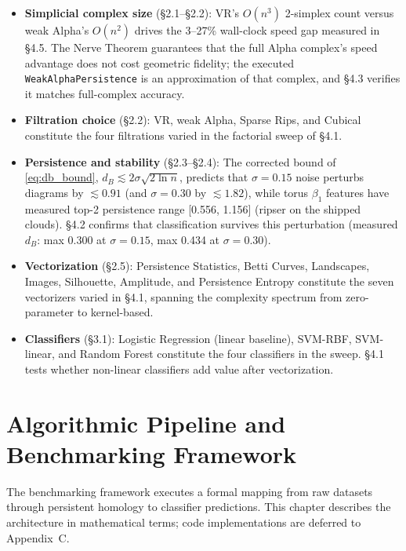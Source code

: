 \documentclass[12pt, a4paper]{report}
\newcommand{\Betti}{\beta}
\theoremstyle{definition}
\theoremstyle{plain}
\theoremstyle{remark}
\begin{document}
\begin{itemize}
  \item \textbf{Simplicial complex size} (\S2.1--\S2.2): VR's
    $O(n^3)$ 2-simplex count versus weak Alpha's $O(n^2)$ drives the
    3--27\% wall-clock speed gap measured in \S4.5. The Nerve
    Theorem guarantees that the full Alpha complex's speed advantage
    does not cost geometric fidelity; the executed
    \texttt{WeakAlphaPersistence} is an approximation of that
    complex, and \S4.3 verifies it matches full-complex accuracy.
  \item \textbf{Filtration choice} (\S2.2): VR, weak Alpha, Sparse Rips,
    and Cubical constitute the four filtrations varied in the
    factorial sweep of \S4.1.
  \item \textbf{Persistence and stability} (\S2.3--\S2.4): The
    corrected bound of \eqref{eq:db_bound}, $d_B \lesssim
    2\sigma\sqrt{2\ln n}$, predicts that $\sigma = 0.15$ noise
    perturbs diagrams by $\lesssim 0.91$ (and $\sigma=0.30$ by
    $\lesssim 1.82$), while torus $\Betti_1$ features have measured
    top-2 persistence range [0.556, 1.156] (ripser on the shipped
    clouds). \S4.2 confirms that classification survives this
    perturbation (measured $d_B$: max 0.300 at $\sigma=0.15$, max
    0.434 at $\sigma=0.30$).
  \item \textbf{Vectorization} (\S2.5): Persistence Statistics,
    Betti Curves, Landscapes, Images, Silhouette, Amplitude, and
    Persistence Entropy constitute the seven vectorizers varied in
    \S4.1, spanning the complexity spectrum from zero-parameter to
    kernel-based.
  \item \textbf{Classifiers} (\S3.1): Logistic Regression (linear
    baseline), SVM-RBF, SVM-linear, and Random Forest constitute the
    four classifiers in the sweep. \S4.1 tests whether non-linear
    classifiers add value after vectorization.
\end{itemize}

\newpage

\chapter{Algorithmic Pipeline and Benchmarking Framework}
\label{chap:methods}

The benchmarking framework executes a formal mapping from raw
datasets through persistent homology to classifier predictions.
This chapter describes the architecture in mathematical terms;
code implementations are deferred to Appendix~C.
\end{document}
